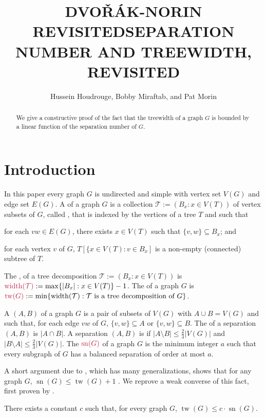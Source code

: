 \documentclass{patmorin}
\title{\MakeUppercase{Dvo\v{r}ák-Norin Revisited}}
\title{\MakeUppercase{Separation Number and Treewidth, Revisited}}
\author{Hussein Houdrouge, Bobby Miraftab, and Pat Morin}
\date{}
\DeclareMathOperator{\sep}{sn}
\DeclareMathOperator{\tw}{tw}
\DeclareMathOperator{\width}{width}
\begin{document}
\maketitle

\begin{abstract}
  We give a constructive proof of the fact that the treewidth of a graph $G$ is bounded by a linear function of the separation number of $G$.
\end{abstract}


\section{Introduction}

In this paper every graph $G$ is undirected and simple with vertex set $V(G)$ and edge set $E(G)$.  A  of a graph $G$ is a collection $\mathcal{T}:=(B_x:x\in V(T))$ of vertex subsets of $G$, called , that is indexed by the vertices of a tree $T$ and such that
\begin{enumerate*}[label=(\roman*)]
  \item\label{covers_edges} for each $vw\in E(G)$, there exists $x\in V(T)$ such that $\{v,w\}\subseteq B_x$; and
  \item\label{connectivity} for each vertex $v$ of $G$, $T[\{x\in V(T): v\in B_x]$ is a non-empty (connected) subtree of $T$.
\end{enumerate*}
The , of a tree decomposition $\mathcal{T}:=(B_x:x\in V(T))$ is $\mathdefin{\width(\mathcal{T})}:=\max\{|B_x|:x\in V(T)\}-1$. The  of a graph $G$ is $\mathdefin{\tw(G)}:=\min\{\width(\mathcal{T}):\text{$\mathcal{T}$ is a tree decomposition of $G$}\}$.

A  $(A,B)$ of a graph $G$ is a pair of subsets of $V(G)$ with $A\cup B= V(G)$ and such that, for each edge $vw$ of $G$, $\{v,w\}\subseteq A$ or $\{v,w\}\subseteq B$.  The  of a separation $(A,B)$ is $|A\cap B|$.  A separation $(A,B)$ is  if $|A\setminus B|\le \tfrac{2}{3}|V(G)|$ and $|B\setminus A|\le \tfrac{2}{3}|V(G)|$.  The  $\mathdefin{\sep(G)}$ of a graph $G$ is the minimum integer $a$ such that every subgraph of $G$ has a balanced separation of order at most $a$.

A short argument due to \citet{robertson.seymour:graph}, which has many generalizations, shows that for any graph $G$, $\sep(G)\le \tw(G)+1$ .  We reprove a weak converse of this fact, first proven by \citet{dvorak.norin:treewidth}.
\begin{thm}\label{main_result}
  There exists a constant $c$ such that, for every graph $G$, $\tw(G)\le c\cdot \sep(G)$.
\end{thm}
\end{document}
